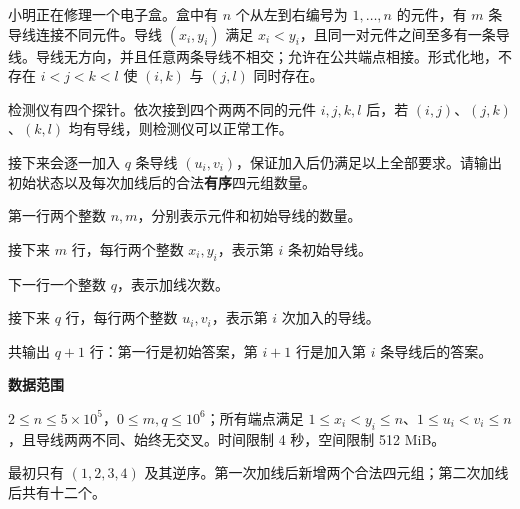 \Legend
小明正在修理一个电子盒。盒中有 $n$ 个从左到右编号为 $1,\ldots,n$ 的元件，有 $m$ 条导线连接不同元件。导线 $(x_i,y_i)$ 满足 $x_i<y_i$，且同一对元件之间至多有一条导线。导线无方向，并且任意两条导线不相交；允许在公共端点相接。形式化地，不存在 $i<j<k<l$ 使 $(i,k)$ 与 $(j,l)$ 同时存在。

检测仪有四个探针。依次接到四个两两不同的元件 $i,j,k,l$ 后，若 $(i,j)$、$(j,k)$、$(k,l)$ 均有导线，则检测仪可以正常工作。

接下来会逐一加入 $q$ 条导线 $(u_i,v_i)$，保证加入后仍满足以上全部要求。请输出初始状态以及每次加线后的合法\textbf{有序}四元组数量。

\Input

第一行两个整数 $n,m$，分别表示元件和初始导线的数量。

接下来 $m$ 行，每行两个整数 $x_i,y_i$，表示第 $i$ 条初始导线。

下一行一个整数 $q$，表示加线次数。

接下来 $q$ 行，每行两个整数 $u_i,v_i$，表示第 $i$ 次加入的导线。

\Output

共输出 $q+1$ 行：第一行是初始答案，第 $i+1$ 行是加入第 $i$ 条导线后的答案。

\textbf{数据范围}

$2\le n\le5\times10^5$，$0\le m,q\le10^6$；所有端点满足 $1\le x_i<y_i\le n$、$1\le u_i<v_i\le n$，且导线两两不同、始终无交叉。时间限制 4 秒，空间限制 512 MiB。

\Examples

\begin{example}
\end{example}

最初只有 $(1,2,3,4)$ 及其逆序。第一次加线后新增两个合法四元组；第二次加线后共有十二个。
